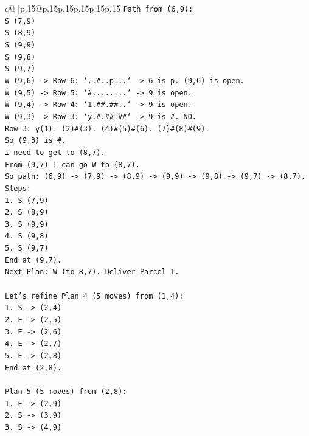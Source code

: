 \documentclass{article}
\begin{document}
{\begin{supertabular}{c@{$\;$}|p{.15\linewidth}@{}p{.15\linewidth}p{.15\linewidth}p{.15\linewidth}p{.15\linewidth}p{.15\linewidth}}
{{{\texttt{Path from (6,9):} \\
\texttt{S (7,9)} \\
\texttt{S (8,9)} \\
\texttt{S (9,9)} \\
\texttt{S (9,8)} \\
\texttt{S (9,7)} \\
\texttt{W (9,6) {-}> Row 6: `..\#..p...` {-}> 6 is p. (9,6) is open.} \\
\texttt{W (9,5) {-}> Row 5: `\#........` {-}> 9 is open.} \\
\texttt{W (9,4) {-}> Row 4: `1.\#\#.\#\#..` {-}> 9 is open.} \\
\texttt{W (9,3) {-}> Row 3: `y.\#.\#\#.\#\#` {-}> 9 is \#. NO.} \\
\texttt{Row 3: y(1). (2)\#(3). (4)\#(5)\#(6). (7)\#(8)\#(9).} \\
\texttt{So (9,3) is \#.} \\
\texttt{I need to get to (8,7).} \\
\texttt{From (9,7) I can go W to (8,7).} \\
\texttt{So path: (6,9) {-}> (7,9) {-}> (8,9) {-}> (9,9) {-}> (9,8) {-}> (9,7) {-}> (8,7).} \\
\texttt{Steps:} \\
\texttt{1. S (7,9)} \\
\texttt{2. S (8,9)} \\
\texttt{3. S (9,9)} \\
\texttt{4. S (9,8)} \\
\texttt{5. S (9,7)} \\
\texttt{End at (9,7).} \\
\texttt{Next Plan: W (to 8,7). Deliver Parcel 1.} \\
\\ 
\texttt{Let's refine Plan 4 (5 moves) from (1,4):} \\
\texttt{1. S {-}> (2,4)} \\
\texttt{2. E {-}> (2,5)} \\
\texttt{3. E {-}> (2,6)} \\
\texttt{4. E {-}> (2,7)} \\
\texttt{5. E {-}> (2,8)} \\
\texttt{End at (2,8).} \\
\\ 
\texttt{Plan 5 (5 moves) from (2,8):} \\
\texttt{1. E {-}> (2,9)} \\
\texttt{2. S {-}> (3,9)} \\
\texttt{3. S {-}> (4,9)} \\
}}}
\end{supertabular}}
\end{document}
